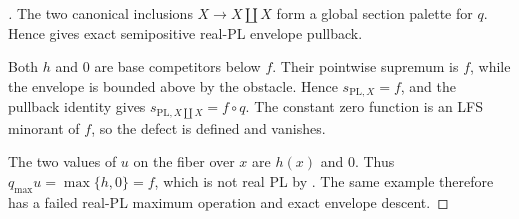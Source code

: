 \begin{proof}[]
The two canonical inclusions $X\to X\amalg X$ form a global section
palette for $q$.  Hence
 gives exact semipositive
real-PL envelope pullback.

Both $h$ and $0$ are base competitors below $f$.  Their pointwise supremum
is $f$, while the envelope is bounded above by the obstacle.  Hence
$s_{\mathrm{PL},X}=f$, and the pullback identity gives
$s_{\mathrm{PL},X\amalg X}=f\circ q$.  The constant zero function is an
LFS minorant of $f$, so the defect is defined and vanishes.

The two values of $u$ on the fiber over $x$ are $h(x)$ and $0$.  Thus
$q_{\max}u=\max\{h,0\}=f$, which is not real PL by
.  The same example therefore
has a failed real-PL maximum operation and exact envelope descent.
\end{proof}
